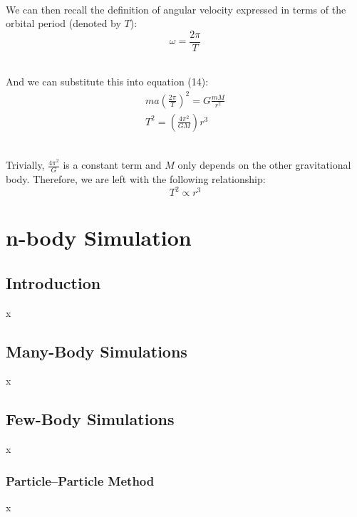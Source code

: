 \documentclass[12pt]{article}
\begin{document}
\begin{spacing}{1.25}
{    \hfill \\
    \noindent We can then recall the definition of angular velocity expressed in terms of the orbital period (denoted by \(T\)):
    \begin{equation*}
        \omega = \frac{2\pi}{T}
    \end{equation*}

    \hfill \\
    \noindent And we can substitute this into equation (14):
    \begin{equation*}
        \begin{split}
            ma \left( \frac{2\pi}{T} \right)^2 = G \frac{mM}{r^2} \\
            T^2 = \left( \frac{4\pi^2}{GM} \right) r^3
        \end{split}
    \end{equation*}
    
    \hfill \\
    \noindent Trivially, \( \frac{4\pi^2}{G} \) is a constant term and \(M\) only depends on the other gravitational body. Therefore, we are left with the following relationship:
    \begin{equation}
        T^2 \propto r^3
    \end{equation}
}


\newpage
\section{n-body Simulation}
\subsection{Introduction}
\par {
    x
}


\subsection{Many-Body Simulations}
\par {
    x
}


\subsection{Few-Body Simulations}
\par {
    x
}


\subsubsection{Particle–Particle Method}
\par {
    x
}



\end{spacing}
\end{document}
